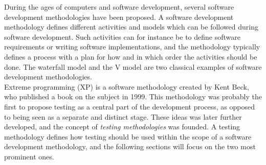 
During the ages of computers and software development, several software
development methodologies have been proposed. A software development
methodology defines different activities and models which can be
followed during software development. Such activities can for instance
be to define software requirements or writing software implementations,
and the methodology typically defines a process with a plan for how and
in which order the activities should be done. The waterfall model and
the V model are two classical examples of software development
methodologies.\cite{article:sw_methodologies}\\

Extreme programming (XP) is a software methodology created by Kent Beck,
who published a book on the subject in 1999\citet{wiki:xp}. This
methodology was probably the first to propose testing as a central part
of the development process, as opposed to being seen as a separate and
distinct stage\cite{article:sw_methodologies}. These ideas was later
further developed, and the concept of \emph{testing methodologies} was
founded. A testing methodology defines how testing should be used within
the scope of a software development methodology, and the following
sections will focus on the two most prominent ones.\\
